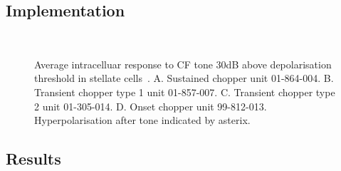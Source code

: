 






\subsection{Implementation}



\begin{figure}[htb]
  \centering
{}\quad%
\\
\quad%
\caption[Average intracelluar response data in stellate cells.]{Average
  intracelluar response to CF tone 30dB above depolarisation threshold in
  stellate
  cells~\citep[Reproduced~from~][]{PaoliniClareyEtAl:2005}. A. Sustained chopper
  unit 01-864-004. B. Transient chopper type 1 unit 01-857-007. C. Transient
  chopper type 2 unit 01-305-014. D. Onset chopper unit
  99-812-013. Hyperpolarisation after tone indicated by
  asterix.    \label{fig:PaoliniAIV}}
\end{figure}





\subsection{Results}


